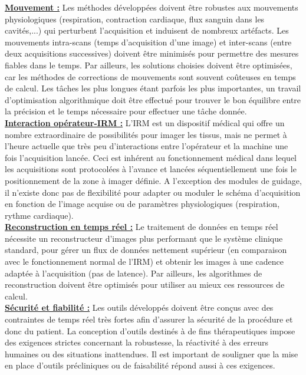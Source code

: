 \documentclass[10pt,a4paper]{report}
\begin{document}
\underline{\textbf{Mouvement :}} Les méthodes développées doivent être robustes aux mouvements physiologiques (respiration, contraction cardiaque, flux sanguin dans les cavités,...) qui perturbent l’acquisition et induisent de nombreux artéfacts. Les mouvements intra-scans (temps d’acquisition d’une image) et inter-scans (entre deux acquisitions successives) doivent être minimisés pour permettre des mesures fiables dans le temps. Par ailleurs, les solutions choisies doivent être optimisées, car les méthodes de corrections de mouvements sont souvent coûteuses en temps de calcul. Les tâches les plus longues étant parfois les plus importantes, un travail d’optimisation algorithmique doit être effectué pour trouver le bon équilibre entre la précision et le temps nécessaire pour effectuer une tâche donnée.\\

\underline{\textbf{Interaction opérateur-IRM :}} L’IRM est un dispositif médical qui offre un nombre extraordinaire de possibilités pour imager les tissus, mais ne permet à l’heure actuelle que très peu d’interactions entre l’opérateur et la machine une fois l’acquisition lancée. Ceci est inhérent au fonctionnement médical dans lequel les acquisitions sont protocolées à l’avance et lancées séquentiellement une fois le positionnement de la zone à imager définie. A l’exception des modules de guidage, il n’existe donc pas de flexibilité pour adapter ou moduler le schéma d’acquisition en fonction de l’image acquise ou de paramètres physiologiques (respiration, rythme cardiaque).\\

\underline{\textbf{Reconstruction en temps réel :}} Le traitement de données en temps réel nécessite un reconstructeur d’images plus performant que le système clinique standard, pour gérer un flux de données nettement supérieur (en comparaison avec le fonctionnement normal de l’IRM) et obtenir les images à une cadence adaptée à l’acquisition (pas de latence). Par ailleurs, les algorithmes de reconstruction doivent être optimisés pour utiliser au mieux ces ressources de calcul.\\

\underline{\textbf{Sécurité et fiabilité :}} Les outils développés doivent être conçus avec des contraintes de temps réel très fortes afin d’assurer la sécurité de la procédure et donc du patient. La conception d’outils destinés à de fins thérapeutiques impose des exigences strictes concernant la robustesse, la réactivité à des erreurs humaines ou des situations inattendues. Il est important de souligner que la mise en place d’outils précliniques ou de faisabilité répond aussi à ces exigences.
\end{document}
